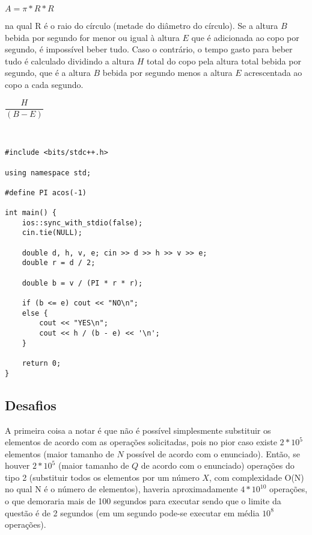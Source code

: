 \documentclass[11pt,fancychapters]{article}
\begin{document}
\begin{center}
\begin{math}
    A = \pi * R * R
\end{math}
\end{center}
na qual R é o raio do círculo (metade do diâmetro do círculo). Se a altura $B$ bebida por segundo for menor ou igual à altura $E$ que é adicionada ao copo por segundo, é impossível beber tudo. Caso o contrário, o tempo gasto para beber tudo é calculado dividindo a altura $H$ total do copo pela altura total bebida por segundo, que é a altura $B$ bebida por segundo menos a altura $E$ acrescentada ao copo a cada segundo.
\begin{center}
\begin{math}
\dfrac{H}{(B - E)}
\end{math}
\end{center}\\
\begin{lstlisting}[style=c++]
#include <bits/stdc++.h>

using namespace std;

#define PI acos(-1)

int main() {
    ios::sync_with_stdio(false);
    cin.tie(NULL);
    
    double d, h, v, e; cin >> d >> h >> v >> e;
    double r = d / 2;
    
    double b = v / (PI * r * r);
    
    if (b <= e) cout << "NO\n";
    else {
        cout << "YES\n";
        cout << h / (b - e) << '\n';
    }

    return 0;
}
\end{lstlisting}
\newpage
\begin{center}\section{Desafios}\end{center}
\noindent
A primeira coisa a notar é que não é possível simplesmente substituir os elementos de acordo com as operações solicitadas, pois no pior caso existe $2*10^{5}$ elementos (maior tamanho de $N$ possível de acordo com o enunciado). Então, se houver $2*10^{5}$ (maior tamanho de $Q$ de acordo com o enunciado) operações do tipo 2 (substituir todos os elementos por um número $X$, com complexidade O(N) no qual N é o número de elementos), haveria aproximadamente $4*10^{10}$ operações, o que demoraria mais de 100 segundos para executar sendo que o limite da questão é de 2 segundos (em um segundo pode-se executar em média $10^{8}$ operações).
\end{document}
